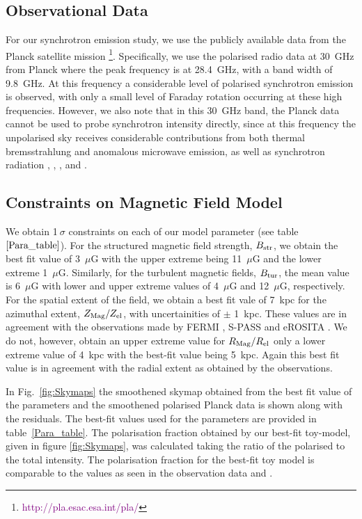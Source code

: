 \documentclass[usenatbib]{mnras}
\begin{document}
\subsection{Observational Data}
For our synchrotron emission study, we use the publicly available data from the Planck satellite mission \footnote{\textcolor{purple}{http://pla.esac.esa.int/pla/}}. Specifically, we use the polarised radio data at 30~GHz from Planck where the peak frequency is at 28.4~GHz, with a band width of 9.8~GHz. At this frequency a considerable level of polarised synchrotron emission is observed, with only a small level of Faraday rotation occurring at these high frequencies. However, we also note that in this 30~GHz band, the Planck data cannot be used to probe synchrotron intensity directly, since at this frequency the unpolarised sky receives considerable contributions from both thermal bremsstrahlung and anomalous microwave emission, as well as synchrotron radiation \cite{Planck_XIX}, \cite{Planck_X}, \cite{Planck_XXV}, and \cite{Planck_XLII}. 

\subsection{Constraints on Magnetic Field Model}
\label{Results}
We obtain 1$~\sigma$ constraints on each of our model parameter (see table~$\ref{Para_table}$). For the structured magnetic field strength, $B_{\rm str}$, we obtain the best fit value of 3~$\mu$G with the upper extreme being 11~$\mu$G and the lower extreme 1~$\mu$G. Similarly, for the turbulent magnetic fields, $B_{\rm tur}$, the mean value is 6~$\mu$G with lower and upper extreme values of 4~$\mu$G and 12~$\mu$G, respectively. For the spatial extent of the field, we obtain a best fit vale of 7~kpc for the azimuthal extent, $Z_{\rm Mag}/Z_{\rm el}$, with uncertainities of $\pm$ 1~kpc. These values are in agreement with the observations made by FERMI \cite{Su_2010}, S-PASS \cite{Carretti_2013} and eROSITA \cite{eROSITA}. We do not, however, obtain an upper extreme value for $R_{\rm Mag}/R_{\rm el}$ only a lower extreme value of 4~kpc with the best-fit value being 5~kpc. Again this best fit value is in agreement with the radial extent as obtained by the observations.

In Fig.~\ref{fig:Skymaps} the smoothened skymap obtained from the best fit value of the parameters and the smoothened polarised Planck data is shown along with the residuals. The best-fit values used for the parameters are provided in table~\ref{Para_table}. 
The polarisation fraction obtained by our best-fit toy-model, given in figure \ref{fig:Skymaps}, was calculated taking the ratio of the polarised to the total intensity. The polarisation fraction for the best-fit toy model is comparable to the values as seen in the observation data \cite{Carretti_2013} and \cite{WMAP_Page}.
\end{document}
